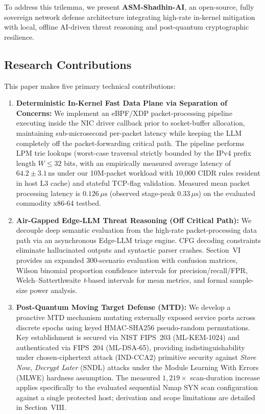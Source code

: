 \documentclass{ieeeaccess}
\renewcommand{\_}{\textunderscore\allowbreak}
\begin{document}
To address this trilemma, we present \textbf{ASM-Shadhin-AI}, an open-source,
fully sovereign network defense architecture integrating high-rate in-kernel
mitigation with local, offline AI-driven threat reasoning and post-quantum
cryptographic resilience.

\subsection{Research Contributions}
This paper makes five primary technical contributions:
\begin{enumerate}
  \item \textbf{Deterministic In-Kernel Fast Data Plane via Separation of Concerns:} We implement an
    eBPF/XDP packet-processing pipeline executing inside the NIC driver callback
    prior to socket-buffer allocation, maintaining sub-microsecond per-packet
    latency while keeping the LLM completely off the packet-forwarding critical path.
    The pipeline performs LPM trie lookups (worst-case traversal strictly bounded by the
    IPv4 prefix length $W \le 32$ bits, with an empirically measured average latency of
    $64.2 \pm 3.1\,\text{ns}$ under our 10M-packet workload with 10{,}000 CIDR rules resident
    in host L3 cache) and stateful TCP-flag validation. Measured mean packet processing
    latency is $0.126\,\mu\text{s}$ (observed stage-peak $0.33\,\mu\text{s}$) on the
    evaluated commodity x86-64 testbed.

  \item \textbf{Air-Gapped Edge-LLM Threat Reasoning (Off Critical Path):} We decouple deep semantic
    evaluation from the high-rate packet-processing data path via an asynchronous Edge-LLM triage
    engine. CFG decoding constraints eliminate hallucinated outputs and
    syntactic parser crashes. Section~VI provides an expanded 300-scenario evaluation
    with confusion matrices, Wilson binomial proportion confidence intervals for precision/recall/FPR,
    Welch--Satterthwaite \textit{t}-based intervals for mean metrics, and formal sample-size power analysis.

  \item \textbf{Post-Quantum Moving Target Defense (MTD):} We develop a proactive
    MTD mechanism mutating externally exposed service ports across discrete epochs
    using keyed HMAC-SHA256 pseudo-random permutations. Key establishment is secured
    via NIST FIPS~203 (ML-KEM-1024) and authenticated via FIPS~204 (ML-DSA-65),
    providing indistinguishability under chosen-ciphertext attack (IND-CCA2)
    primitive security against \emph{Store Now, Decrypt Later} (SNDL) attacks under the
    Module Learning With Errors (MLWE) hardness assumption. The measured $1{,}219\times$
    scan-duration increase applies specifically to the evaluated sequential Nmap
    SYN scan configuration against a single protected host; derivation and scope
    limitations are detailed in Section~VIII.


\end{enumerate}
\end{document}
